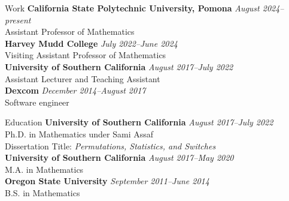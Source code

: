 \documentclass{cv} %
\date{\today}
\begin{document}

\begin{rSection}{Work}
  \textbf{California State Polytechnic University, Pomona} \hfill {\em August 2024--present}
  \\ Assistant Professor of Mathematics
  \\
  \textbf{Harvey Mudd College} \hfill {\em July 2022--June 2024}
  \\ Visiting Assistant Professor of Mathematics
  \\
  \textbf{University of Southern California} \hfill {\em August 2017--July 2022}
  \\ Assistant Lecturer and Teaching Assistant
  \\ \textbf{Dexcom} \hfill {\em December 2014--August 2017}
  \\ Software engineer
\end{rSection}

\begin{rSection}{Education}
  \textbf{University of Southern California} \hfill {\em August 2017--July 2022}
  \\ Ph.D. in Mathematics under Sami Assaf
  \\ Dissertation Title: \textit{Permutations, Statistics, and Switches}
  \\
  \textbf{University of Southern California} \hfill {\em August 2017--May 2020}
  \\ M.A. in Mathematics
  \\
  \textbf{Oregon State University} \hfill {\em September 2011--June 2014}
  \\ B.S. in Mathematics
\end{rSection}
\end{document}
